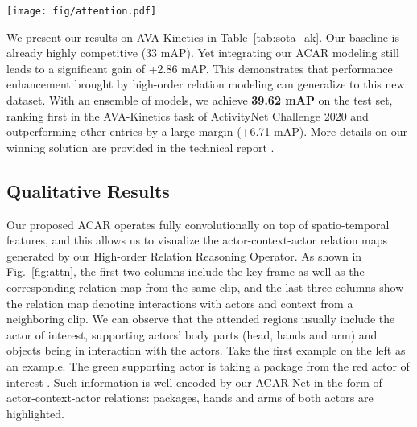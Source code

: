 \begin{figure*}[t]
\centering
\texttt{[image: fig/attention.pdf]}
\caption{\textbf{Visualization of actor-context-actor attention maps on AVA.} \textcolor{red}{Actors of interest} are marked in red and \textcolor{green}{supporting actors} in green. Heat maps illustrate the context regions' attention weights  from actor-context-actor relation reasoning. We observe that our model has learned to attend to useful relations between actors and context, and the context serves as the bridge for connecting actors.
\label{fig:attn}}
\vspace{-4mm}
\end{figure*}



We present our results on AVA-Kinetics in Table~\ref{tab:sota_ak}. Our baseline is already highly competitive (33 mAP). Yet integrating our ACAR modeling still leads to a significant gain of +2.86 mAP. This demonstrates that performance enhancement brought by high-order relation modeling can generalize to this new dataset.
With an ensemble of models, we achieve \textbf{39.62 mAP} on the test set, ranking first in the AVA-Kinetics task of ActivityNet Challenge 2020 and outperforming other entries by a large margin (+6.71 mAP). More details on our winning solution are provided in the technical report \cite{chen20201st}.











\subsection{Qualitative Results} 

Our proposed ACAR operates fully convolutionally on top of spatio-temporal features, and this allows us to visualize the actor-context-actor relation maps  generated by our High-order Relation Reasoning Operator. As shown in Fig.~\ref{fig:attn}, the first two columns include the key frame as well as the corresponding relation map from the same clip, and the last three columns show the relation map denoting interactions with actors and context from a neighboring clip.
We can observe that the attended regions usually include the actor of interest, supporting actors' body parts (\ie head, hands and arm) and objects being in interaction with the actors. Take the first example on the left as an example. The green supporting actor  is taking a package from the red actor of interest . Such information is well encoded by our ACAR-Net in the form of actor-context-actor relations: packages, hands and arms of both actors are highlighted.






%

